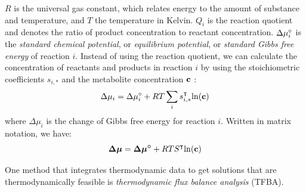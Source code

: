 $R$ is the universal gas constant, which relates energy to the amount of substance and temperature, and $T$ the temperature in Kelvin. $Q_i$ is the reaction quotient and denotes the ratio of product concentration to reactant concentration. $\Delta \mu \degree_i$ is the \textit{standard chemical potential}, or \textit{equilibrium potential}, or \textit{standard Gibbs free energy} of reaction $i$.
Instead of using the reaction quotient, we can calculate the concentration of reactants and products in reaction $i$ by using the stoichiometric coefficients $s_{i,*}$ and the metabolite concentration $\bold c$ \cite{noor_removing_2018}:
\begin{equation*}
    \Delta \mu_i = \Delta \mu \degree_i + RT \sum_{i} s_{i,*}^\intercal \mathrm{ln} (\bold c)
    \label{Eq:lawOfThermodynamics}
\end{equation*}
where $\Delta \mu_i$ is the change of Gibbs free energy for reaction $i$. 
Written in matrix notation, we have:
\begin{equation}
   \boldsymbol{\Delta \mu} = \boldsymbol{\Delta \mu \degree} + RT S^\intercal \mathrm{ln}(\bold c)
\end{equation}

One method that integrates thermodynamic data to get solutions that are thermodynamically feasible is \textit{thermodynamic flux balance analysis} (TFBA). 


